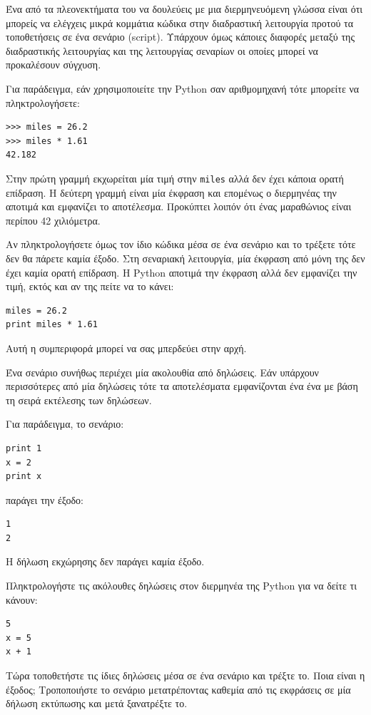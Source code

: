 \documentclass[10pt]{book}
\begin{document}
Ένα από τα πλεονεκτήματα του να δουλεύεις με μια διερμηνευόμενη γλώσσα
είναι ότι μπορείς να ελέγχεις μικρά κομμάτια κώδικα στην διαδραστική
λειτουργία προτού τα τοποθετήσεις σε ένα σενάριο (script). Υπάρχουν όμως κάποιες διαφορές μεταξύ της διαδραστικής λειτουργίας και της λειτουργίας σεναρίων οι οποίες μπορεί να προκαλέσουν σύγχυση.

Για παράδειγμα, εάν χρησιμοποιείτε την Python σαν αριθμομηχανή τότε 
μπορείτε να πληκτρολογήσετε:

\begin{verbatim}
>>> miles = 26.2
>>> miles * 1.61
42.182
\end{verbatim}

Στην πρώτη γραμμή εκχωρείται μία τιμή στην {\tt miles} αλλά 
δεν έχει κάποια ορατή επίδραση.  Η δεύτερη γραμμή είναι μία έκφραση και 
επομένως ο διερμηνέας την αποτιμά και εμφανίζει το αποτέλεσμα.  Προκύπτει 
λοιπόν ότι ένας μαραθώνιος είναι περίπου 42 χιλιόμετρα.

Αν πληκτρολογήσετε όμως τον ίδιο κώδικα μέσα σε ένα σενάριο και το
τρέξετε τότε δεν θα πάρετε καμία έξοδο. Στη σεναριακή λειτουργία, μία έκφραση 
από μόνη της δεν έχει καμία ορατή επίδραση. Η Python αποτιμά 
την έκφραση αλλά δεν εμφανίζει την τιμή, εκτός και αν της πείτε να το κάνει:


\begin{verbatim}
miles = 26.2
print miles * 1.61
\end{verbatim}

Αυτή η συμπεριφορά μπορεί να σας μπερδεύει στην αρχή.

Ένα σενάριο συνήθως περιέχει μία ακολουθία από δηλώσεις. Εάν
υπάρχουν περισσότερες από μία δηλώσεις τότε τα αποτελέσματα εμφανίζονται
ένα ένα με βάση τη σειρά εκτέλεσης των δηλώσεων.

Για παράδειγμα, το σενάριο:

\begin{verbatim}
print 1
x = 2
print x
\end{verbatim}
%

παράγει την έξοδο:

\begin{verbatim}
1
2
\end{verbatim}
%

Η δήλωση εκχώρησης δεν παράγει καμία έξοδο.\\

\begin{exercise}

Πληκτρολογήστε τις ακόλουθες δηλώσεις στον διερμηνέα της Python 
για να δείτε τι κάνουν:


\begin{verbatim}
5
x = 5
x + 1
\end{verbatim}
%

Τώρα τοποθετήστε τις ίδιες δηλώσεις μέσα σε ένα σενάριο και τρέξτε το.
Ποια είναι η έξοδος; Τροποποιήστε το σενάριο μετατρέποντας καθεμία από
τις εκφράσεις σε μία δήλωση εκτύπωσης και μετά ξανατρέξτε το.
\end{exercise}
\end{document}
